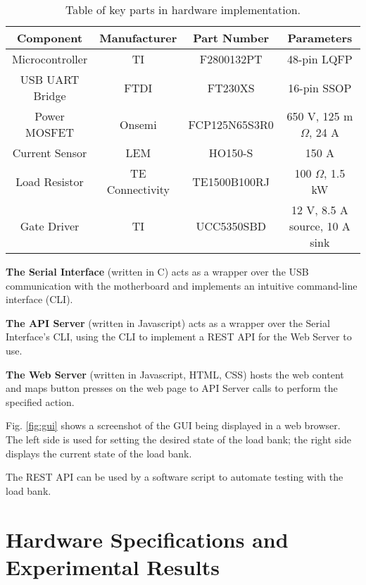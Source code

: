 \documentclass{article}
\begin{document}
\begin{table*}[t]
\vspace{-0.1cm}
\centering
\caption{Table of key parts in hardware implementation.}
\label{tab:parts}
\begin{tabular}{cccc}
\midrule
\textbf{Component} & \textbf{Manufacturer}   & \textbf{Part Number}      & \textbf{Parameters}           \\
\midrule
Microcontroller    & TI  &        F2800132PT                & 48-pin LQFP                   \\
USB UART Bridge    & FTDI &       FT230XS                 & 16-pin SSOP                   \\
Power MOSFET       & Onsemi  &    FCP125N65S3R0         & 650 V, 125 m$\Omega$, 24 A    \\
Current Sensor     & LEM &        HO150-S                  & 150 A                         \\
Load Resistor      & TE Connectivity &   TE1500B100RJ & 100 $\Omega$, 1.5 kW          \\
Gate Driver        & TI &         UCC5350SBD                & 12 V, 8.5 A source, 10 A sink \\
\midrule
\end{tabular}
\end{table*}

\textbf{The Serial Interface} (written in C) acts as a wrapper over the USB communication with the motherboard and implements an intuitive command-line interface (CLI).

\textbf{The API Server} (written in Javascript) acts as a wrapper over the Serial Interface's CLI, using the CLI to implement a REST API for the Web Server to use.

\textbf{The Web Server} (written in Javascript, HTML, CSS) hosts the web content and maps button presses on the web page to API Server calls to perform the specified action.

Fig. \ref{fig:gui} shows a screenshot of the GUI being displayed in a web browser. The left side is used for setting the desired state of the load bank; the right side displays the current state of the load bank.

The REST API can be used by a software script to automate testing with the load bank.

\vspace{0.5cm}
\section{Hardware Specifications and Experimental Results}
\label{sec:hardware}
\end{document}
